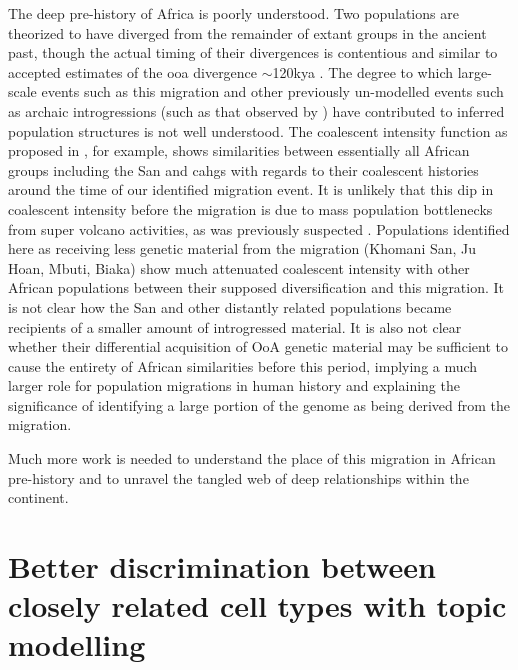 The deep pre-history of Africa is poorly understood. Two populations are theorized to have diverged from the remainder of extant groups in the ancient past, though the actual timing of their divergences is contentious and similar to accepted estimates of the \gls{ooa} divergence $\sim$120kya \cite{Lipson2019}. The degree to which large-scale events such as this migration and other previously un-modelled events such as archaic introgressions (such as that observed by \textcite{Durvasula2019}) have contributed to inferred population structures is not well understood. The coalescent intensity function as proposed in \textcite{Albers2019}, for example, shows similarities between essentially all African groups including the San and \glspl{cahg} with regards to their coalescent histories around the time of our identified migration event. It is unlikely that this dip in coalescent intensity before the migration is due to mass population bottlenecks from super volcano activities, as was previously suspected \cite{Smith2018}. Populations identified here as receiving less genetic material from the migration (Khomani San, Ju Hoan, Mbuti, Biaka) show much attenuated coalescent intensity with other African populations between their supposed diversification and this migration. It is not clear how the San and other distantly related populations became recipients of a smaller amount of introgressed material. It is also not clear whether their differential acquisition of OoA genetic material may be sufficient to cause the entirety of African similarities before this period, implying a much larger role for population migrations in human history and explaining the significance of identifying a large portion of the genome as being derived from the migration. 

Much more work is needed to understand the place of this migration in African pre-history and to unravel the tangled web of deep relationships within the continent. 

\section{Better discrimination between closely related cell types with topic modelling}

